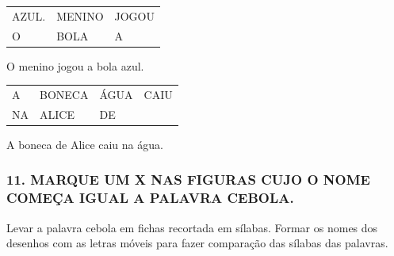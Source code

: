 \begin{longtable}[]{@{}lll@{}}
\toprule
AZUL. & MENINO & JOGOU\tabularnewline
O & BOLA & A\tabularnewline
\bottomrule
\end{longtable}

O menino jogou a bola azul.

\begin{longtable}[]{@{}llll@{}}
\toprule
A & BONECA & ÁGUA & CAIU\tabularnewline
NA & ALICE & DE\tabularnewline
\bottomrule
\end{longtable}

A boneca de Alice caiu na água.

\subsubsection{11. MARQUE UM X NAS FIGURAS CUJO O NOME COMEÇA IGUAL A
PALAVRA
CEBOLA.}\label{marque-um-x-nas-figuras-cujo-o-nome-comeuxe7a-igual-a-palavra-cebola.}

Levar a palavra cebola em fichas recortada em sílabas. Formar os
nomes dos desenhos com as letras móveis para fazer comparação das
sílabas das palavras.

